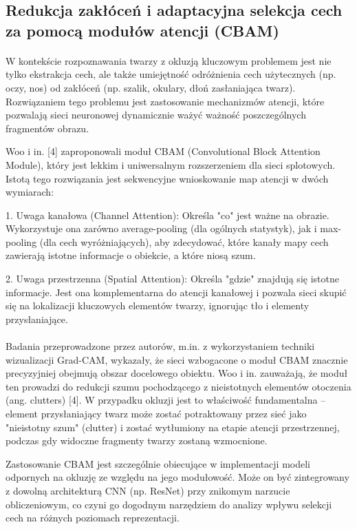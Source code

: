 \subsection{Redukcja zakłóceń i adaptacyjna selekcja cech za pomocą modułów atencji (CBAM)}

\paragraph{}W kontekście rozpoznawania twarzy z okluzją kluczowym problemem jest nie tylko ekstrakcja cech, ale także umiejętność odróżnienia cech użytecznych (np. oczy, nos) od zakłóceń (np. szalik, okulary, dłoń zasłaniająca twarz). Rozwiązaniem tego problemu jest zastosowanie mechanizmów atencji, które pozwalają sieci neuronowej dynamicznie ważyć ważność poszczególnych fragmentów obrazu.

Woo i in. [4] zaproponowali moduł CBAM (Convolutional Block Attention Module), który jest lekkim i uniwersalnym rozszerzeniem dla sieci splotowych. Istotą tego rozwiązania jest sekwencyjne wnioskowanie map atencji w dwóch wymiarach:

1. Uwaga kanałowa (Channel Attention): Określa "co" jest ważne na obrazie. Wykorzystuje ona zarówno average-pooling (dla ogólnych statystyk), jak i max-pooling (dla cech wyróżniających), aby zdecydować, które kanały mapy cech zawierają istotne informacje o obiekcie, a które niosą szum.

2. Uwaga przestrzenna (Spatial Attention): Określa "gdzie" znajdują się istotne informacje. Jest ona komplementarna do atencji kanałowej i pozwala sieci skupić się na lokalizacji kluczowych elementów twarzy, ignorując tło i elementy przysłaniające.

\paragraph{}Badania przeprowadzone przez autorów, m.in. z wykorzystaniem techniki wizualizacji Grad-CAM, wykazały, że sieci wzbogacone o moduł CBAM znacznie precyzyjniej obejmują obszar docelowego obiektu. Woo i in. zauważają, że moduł ten prowadzi do redukcji szumu pochodzącego z nieistotnych elementów otoczenia (ang. clutters) [4]. W przypadku okluzji jest to właściwość fundamentalna – element przysłaniający twarz może zostać potraktowany przez sieć jako "nieistotny szum" (clutter) i zostać wytłumiony na etapie atencji przestrzennej, podczas gdy widoczne fragmenty twarzy zostaną wzmocnione.

Zastosowanie CBAM jest szczególnie obiecujące w implementacji modeli odpornych na okluzję ze względu na jego modułowość. Może on być zintegrowany z dowolną architekturą CNN (np. ResNet) przy znikomym narzucie obliczeniowym, co czyni go dogodnym narzędziem do analizy wpływu selekcji cech na różnych poziomach reprezentacji.